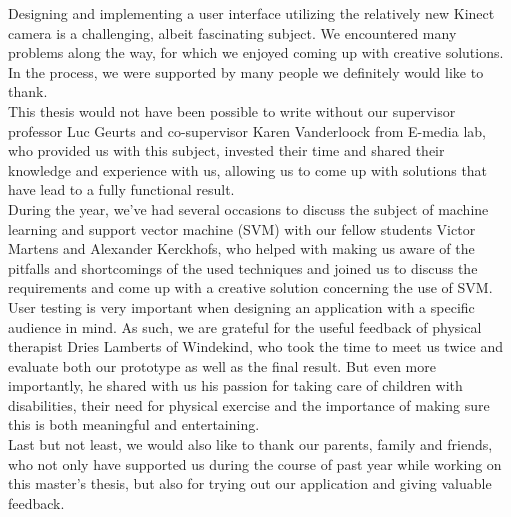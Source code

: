 Designing and implementing a user interface utilizing the relatively new Kinect camera is a challenging, albeit fascinating subject. We encountered many problems along the way, for which we enjoyed coming up with creative solutions. In the process, we were supported by many people we definitely would like to thank.\\

This thesis would not have been possible to write without our supervisor professor Luc Geurts and co-supervisor Karen Vanderloock from E-media lab, who provided us with this subject, invested their time and shared their knowledge and experience with us, allowing us to come up with solutions that have lead to a fully functional result.\\

During the year, we've had several occasions to discuss the subject of machine learning and support vector machine (SVM) with our fellow students Victor Martens and Alexander Kerckhofs, who helped with making us aware of the pitfalls and shortcomings of the used techniques and joined us to discuss the requirements and come up with a creative solution concerning the use of SVM.\\

User testing is very important when designing an application with a specific audience in mind. As such, we are grateful for the useful feedback of physical therapist Dries Lamberts of Windekind, who took the time to meet us twice and evaluate both our prototype as well as the final result. But even more importantly, he shared with us his passion for taking care of children with disabilities, their need for physical exercise and the importance of making sure this is both meaningful and entertaining.\\

Last but not least, we would also like to thank our parents, family and friends, who not only have supported us during the course of past year while working on this master's thesis, but also for trying out our application and giving valuable feedback.